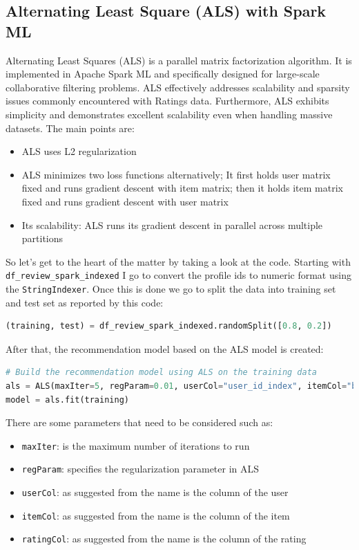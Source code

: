 \documentclass[12pt,english]{report}
\begin{document}
\subsection{Alternating Least Square (ALS) with Spark ML}
Alternating Least Squares (ALS) is a parallel matrix factorization algorithm. It is implemented in Apache Spark ML and specifically designed for large-scale collaborative filtering problems. ALS effectively addresses scalability and sparsity issues commonly encountered with Ratings data. Furthermore, ALS exhibits simplicity and demonstrates excellent scalability even when handling massive datasets. The main points are:
\begin{itemize}
\item ALS uses L2 regularization
\item ALS minimizes two loss functions alternatively; It first holds user matrix fixed and runs gradient descent with item matrix; then it holds item matrix fixed and runs gradient descent with user matrix
\item Its scalability: ALS runs its gradient descent in parallel across multiple partitions
\end{itemize}
So let's get to the heart of the matter by taking a look at the code.
Starting with \texttt{df\_review\_spark\_indexed} I go to convert the profile ids to numeric format using the \texttt{StringIndexer}. Once this is done we go to split the data into training set and test set as reported by this code:
\begin{lstlisting}[language={Python},escapechar=|,label={lst:splittraintest},caption={Splitting dataset in training and test set for ALS}]
(training, test) = df_review_spark_indexed.randomSplit([0.8, 0.2])
\end{lstlisting}
After that, the recommendation model based on the ALS model is created:
\begin{lstlisting}[language={Python},escapechar=|,label={lst:splittraintest},caption={Building recommended system model based on the ALS model}]
# Build the recommendation model using ALS on the training data
als = ALS(maxIter=5, regParam=0.01, userCol="user_id_index", itemCol="business_id_index", ratingCol="stars_review")
model = als.fit(training)
\end{lstlisting}
There are some parameters that need to be considered such as:
\begin{itemize}
\item \texttt{maxIter}: is the maximum number of iterations to run
\item \texttt{regParam}: specifies the regularization parameter in ALS
\item \texttt{userCol}: as suggested from the name is the column of the user 
\item \texttt{itemCol}: as suggested from the name is the column of the item 
\item \texttt{ratingCol}: as suggested from the name is the column of the rating 
\end{itemize}
\end{document}
